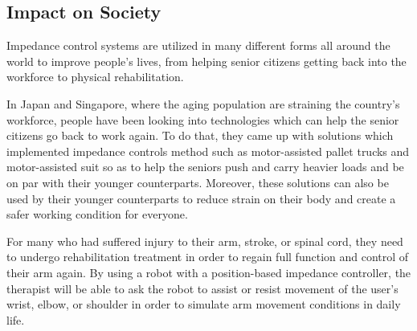\subsection*{Impact on Society}
Impedance control systems are utilized in many different forms all around the world to improve people's lives, from helping senior citizens getting back into the workforce to physical rehabilitation.

In Japan and Singapore, where the aging population are straining the country's workforce, people have been looking into technologies which can help the senior citizens go back to work again. To do that, they came up with solutions which implemented impedance controls method such as motor-assisted pallet trucks and motor-assisted suit so as to help the seniors push and carry heavier loads and be on par with their younger counterparts. Moreover, these solutions can also be used by their younger counterparts to reduce strain on their body and create a safer working condition for everyone.

For many who had suffered injury to their arm, stroke, or spinal cord, they need to undergo rehabilitation treatment in order to regain full function and control of their arm again. By using a robot with a position-based impedance controller, the therapist will be able to ask the robot to assist or resist movement of the user's wrist, elbow, or shoulder in order to simulate arm movement conditions in daily life.



